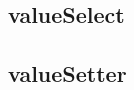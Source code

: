 \subsection{valueSelect}
\label{sub:vSelect}
\subsection{valueSetter}
\label{sub:vSetter}
\begin{itemize}
\end{itemize}
